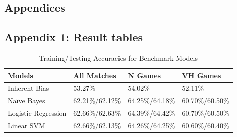 \documentclass{article}
\begin{document}
\newpage
\begin{appendix}
\section*{Appendices}
\subsection*{Appendix 1: Result tables}


\bgroup
\def\arraystretch{1.7}%
{
\begin{table}[htb]
\centering
\begin{tabularx}{\textwidth}{ |X|l|l|l| } 
\hline
\textbf{Models} & \textbf{All Matches} & \textbf{N Games} & \textbf{VH Games} \\
\hline
Inherent Bias & 53.27\% & 54.02\% & 52.11\% \\
\hline
Naïve Bayes & 62.21\%/62.12\% & 64.25\%/64.18\% & 60.70\%/60.50\% \\
\hline
Logistic Regression & 62.66\%/62.63\% & 64.39\%/64.42\% & 60.70\%/60.50\% \\
\hline
Linear SVM & 62.66\%/62.13\% & 64.26\%/64.25\% & 60.60\%/60.40\% \\

\hline
\end{tabularx}
\caption{Training/Testing Accuracies for Benchmark Models}
\label{table:benchmark}
\end{table}}
\egroup








\end{appendix}
\end{document}
